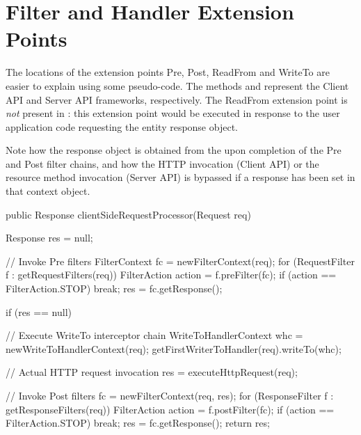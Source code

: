 \chapter{Filter and Handler Extension Points}
\label{extension_points}

The locations of the extension points Pre, Post, ReadFrom and WriteTo are easier to explain using some pseudo-code. The methods  and  represent the Client API and Server API frameworks, respectively. The ReadFrom extension point is \emph{not} present in : this extension point would be executed in response to the user application code requesting the entity response object. 

Note how the response object is obtained from the  upon completion of the Pre and Post filter chains, and how the HTTP invocation (Client API) or the resource method invocation (Server API) is bypassed if a response has been set in that context object. 

\begin{listing}{1}
public Response clientSideRequestProcessor(Request req) {
    Response res = null;

    // Invoke Pre filters
    FilterContext fc = newFilterContext(req);
    for (RequestFilter f : getRequestFilters(req)) {
        FilterAction action = f.preFilter(fc);
        if (action == FilterAction.STOP) break;
    }
    res = fc.getResponse();

    if (res == null) {
        // Execute WriteTo interceptor chain
        WriteToHandlerContext whc = newWriteToHandlerContext(req);
        getFirstWriterToHandler(req).writeTo(whc);

        // Actual HTTP request invocation
        res = executeHttpRequest(req);
    }

    // Invoke Post filters
    fc = newFilterContext(req, res);
    for (ResponseFilter f : getResponseFilters(req)) {
        FilterAction action = f.postFilter(fc);
        if (action == FilterAction.STOP) break;
    }
    res = fc.getResponse();       
    return res;
}
\end{listing}

